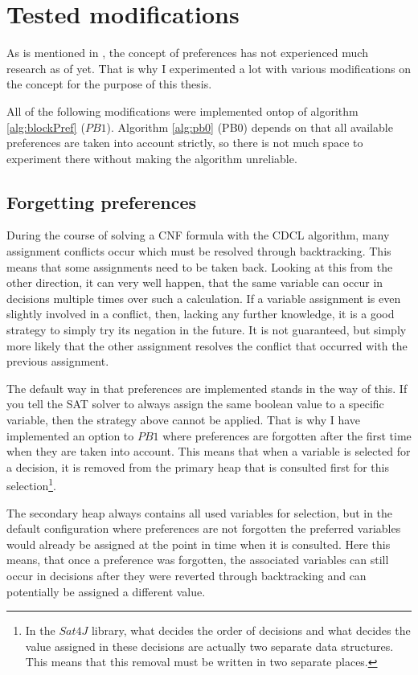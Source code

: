 \section{Tested modifications}
As is mentioned in \cite{PJ18}, the concept of preferences has not experienced much research as of yet. That is why I experimented a lot with various modifications on the concept for the purpose of this thesis.

All of the following modifications were implemented ontop of algorithm \ref{alg:blockPref} ($PB1$). Algorithm \ref{alg:pb0} (PB0) depends on that all available preferences are taken into account strictly, so there is not much space to experiment there without making the algorithm unreliable. 


\subsection{Forgetting preferences}
\label{sec:amnesPrefs}
During the course of solving a CNF formula with the CDCL algorithm, many assignment conflicts occur which must be resolved through backtracking. This means that some assignments need to be taken back. Looking at this from the other direction, it can very well happen, that the same variable can occur in decisions multiple times over such a calculation. If a variable assignment is even slightly involved in a conflict, then, lacking any further knowledge, it is a good strategy to simply try its negation in the future. It is not guaranteed, but simply more likely that the other assignment resolves the conflict that occurred with the previous assignment. 

The default way in that preferences are implemented stands in the way of this. If you tell the SAT solver to always assign the same boolean value to a specific variable, then the strategy above cannot be applied. That is why I have implemented an option to $PB1$ where preferences are forgotten after the first time when they are taken into account. This means that when a variable is selected for a decision, it is removed from the primary heap that is consulted first for this selection\footnote{
	In the $Sat4J$ library, what decides the order of decisions and what decides the value assigned in these decisions are actually two separate data structures. This means that this removal must be written in two separate places.
}. 

The secondary heap always contains all used variables for selection, but in the default configuration where preferences are not forgotten the preferred variables would already be assigned at the point in time when it is consulted. Here this means, that once a preference was forgotten, the associated variables can still occur in decisions after they were reverted through backtracking and can potentially be assigned a different value. 


